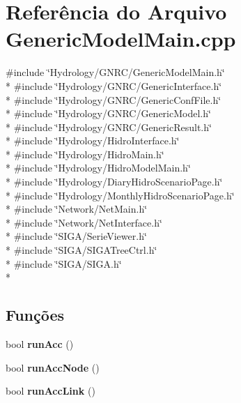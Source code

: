 \section{Referência do Arquivo Generic\+Model\+Main.\+cpp}
\label{_generic_model_main_8cpp}
{\ttfamily \#include \char`\"{}Hydrology/\+G\+N\+R\+C/\+Generic\+Model\+Main.\+h\char`\"{}}\\*
{\ttfamily \#include \char`\"{}Hydrology/\+G\+N\+R\+C/\+Generic\+Interface.\+h\char`\"{}}\\*
{\ttfamily \#include \char`\"{}Hydrology/\+G\+N\+R\+C/\+Generic\+Conf\+File.\+h\char`\"{}}\\*
{\ttfamily \#include \char`\"{}Hydrology/\+G\+N\+R\+C/\+Generic\+Model.\+h\char`\"{}}\\*
{\ttfamily \#include \char`\"{}Hydrology/\+G\+N\+R\+C/\+Generic\+Result.\+h\char`\"{}}\\*
{\ttfamily \#include \char`\"{}Hydrology/\+Hidro\+Interface.\+h\char`\"{}}\\*
{\ttfamily \#include \char`\"{}Hydrology/\+Hidro\+Main.\+h\char`\"{}}\\*
{\ttfamily \#include \char`\"{}Hydrology/\+Hidro\+Model\+Main.\+h\char`\"{}}\\*
{\ttfamily \#include \char`\"{}Hydrology/\+Diary\+Hidro\+Scenario\+Page.\+h\char`\"{}}\\*
{\ttfamily \#include \char`\"{}Hydrology/\+Monthly\+Hidro\+Scenario\+Page.\+h\char`\"{}}\\*
{\ttfamily \#include \char`\"{}Network/\+Net\+Main.\+h\char`\"{}}\\*
{\ttfamily \#include \char`\"{}Network/\+Net\+Interface.\+h\char`\"{}}\\*
{\ttfamily \#include \char`\"{}S\+I\+G\+A/\+Serie\+Viewer.\+h\char`\"{}}\\*
{\ttfamily \#include \char`\"{}S\+I\+G\+A/\+S\+I\+G\+A\+Tree\+Ctrl.\+h\char`\"{}}\\*
{\ttfamily \#include \char`\"{}S\+I\+G\+A/\+S\+I\+G\+A.\+h\char`\"{}}\\*
\subsection*{Funções}
\begin{DoxyCompactItemize}
\item 
bool {\bf run\+Acc} ()
\item 
bool {\bf run\+Acc\+Node} ()
\item 
bool {\bf run\+Acc\+Link} ()
\end{DoxyCompactItemize}


